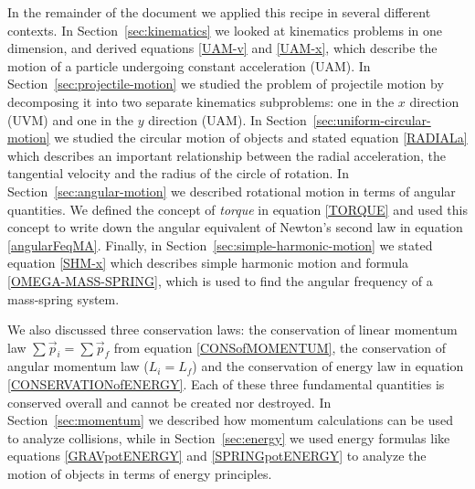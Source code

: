 \documentclass[letterpaper,9pt,journal]{IEEEtran}
\begin{document}
In the remainder of the document we applied this recipe in several different contexts.
In Section~\ref{sec:kinematics} we looked at kinematics problems in one dimension,
and derived equations \eqref{UAM-v} and \eqref{UAM-x}, 
which describe the motion of a particle undergoing constant acceleration (UAM).
%
In Section~\ref{sec:projectile-motion} we studied the problem of projectile motion by decomposing it into
two separate kinematics subproblems: one in the $x$ direction (UVM) and one in the $y$ direction (UAM).
%
In Section~\ref{sec:uniform-circular-motion} we studied the circular motion of objects %
and stated equation \eqref{RADIALa} which describes an important relationship between the radial acceleration,
the tangential velocity and the radius of the circle of rotation.
%
In Section~\ref{sec:angular-motion} we described rotational motion in terms of angular quantities.
We defined the concept of \emph{torque} in equation \eqref{TORQUE} and used this
concept to write down the angular equivalent of Newton's second law in equation \eqref{angularFeqMA}.
%
Finally, in Section~\ref{sec:simple-harmonic-motion} we stated equation \eqref{SHM-x}
which describes simple harmonic motion and formula \eqref{OMEGA-MASS-SPRING}, 
which is used to find the angular frequency of a mass-spring system.

%



We also discussed three conservation laws:
the conservation of linear momentum law $\sum\vec{p}_{i} = \sum\vec{p}_{f}$ 
from equation \eqref{CONSofMOMENTUM}, 
the conservation of angular momentum law ($L_{i} = L_{f}$) and the conservation of  energy law %
in equation \eqref{CONSERVATIONofENERGY}.
Each of these three fundamental quantities is conserved overall and cannot be created nor destroyed. 
In Section~\ref{sec:momentum} we described how momentum calculations can be used to analyze collisions,
while in Section~\ref{sec:energy} we used energy formulas like 
equations  \eqref{GRAVpotENERGY} and  \eqref{SPRINGpotENERGY} to analyze the motion of objects in
terms of energy principles.
%
\end{document}

